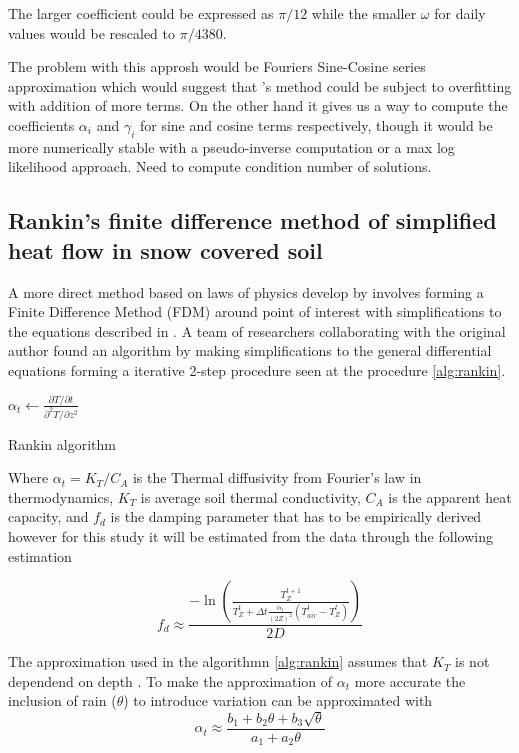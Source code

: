 The larger coefficient could be expressed as $\pi/12$ while the smaller $\omega$ for daily values would be rescaled to $\pi/4380$.

The problem with this approsh would be Fouriers Sine-Cosine series approximation which would suggest that \citeauthor{plauborg_simple_2002}'s method could be subject to overfitting with addition of more terms. On the other hand it gives us a way to compute the coefficients $\alpha_i$ and $\gamma_i$ for sine and cosine terms respectively, though it would be more numerically stable with a pseudo-inverse computation or a max log likelihood approach. \alert{Need to compute condition number of solutions.}

\subsection[Rankin algorithm]{Rankin's finite difference method of simplified heat flow in snow covered soil}

A more direct method based on laws of physics develop by \citeauthor{karvonen_model_1988} involves forming a Finite Difference Method (FDM) around point of interest with simplifications to the equations described in . A team of researchers collaborating with the original author found an algorithm by making simplifications to the general differential equations forming a iterative 2-step procedure seen at the procedure \ref{alg:rankin}.

\begin{algorithm}[h]
	\SetAlgoLined
	$\alpha_t \gets \frac{\partial T / \partial t}{\partial^2 T / \partial z^2}$\;
	\caption{Rankin algorithm}
	\label{alg:rankin}
\end{algorithm}

Where $\alpha_t = K_T/C_A$ is the Thermal diffusivity from Fourier's law in thermodynamics, $K_T$ is average soil thermal conductivity, $C_A$ is the apparent heat capacity, and $f_d$ is the damping parameter that has to be empirically derived however for this study it will be estimated from the data through the following estimation

$$
f_d \approx \frac{-\ln\left(\frac{T_Z^{t+1}}{T_Z^t + \Delta t \frac{\alpha_t}{(2Z)^2} (T^t_{air}-T_Z^t)}\right)}{2D}
$$

The approximation used in the algorithmn \ref{alg:rankin} assumes that $K_T$ is not dependend on depth . To make the approximation of $\alpha_t$ more accurate the inclusion of rain ($\theta$) to introduce variation can be approximated with
$$
\alpha_t \approx \frac{b_1 + b_2\theta +b_3\sqrt{\theta}}{a_1 + a_2\theta}
$$

